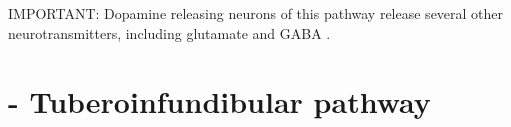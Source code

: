 %   

IMPORTANT: Dopamine releasing neurons of this pathway release several other
neurotransmitters, including glutamate \citep{tecuapetla2010} and GABA
\citep{tritsch2012}.




\section{- Tuberoinfundibular pathway}
\label{sec:tuberoinfundibular-pathway}


